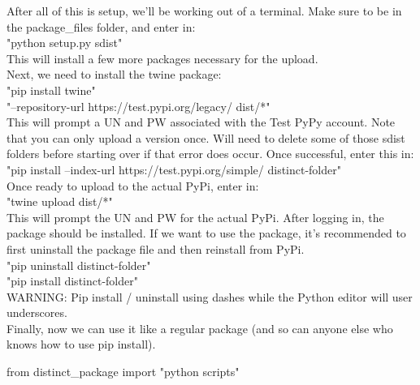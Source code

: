After all of this is setup, we'll be working out of a terminal. Make sure to be in the package\_files folder, and enter in:
\\

"python setup.py sdist"
\\

This will install a few more packages necessary for the upload.
\\

Next, we need to install the twine package:
\\

"pip install twine"
\\

"--repository-url https://test.pypi.org/legacy/ dist/*"
\\

This will prompt a UN and PW associated with the Test PyPy account. Note that you can only upload a version once. Will need to delete some of those sdist folders before starting over if that error does occur. Once successful, enter this in:
\\

"pip install --index-url https://test.pypi.org/simple/ distinct-folder"
\\

Once ready to upload to the actual PyPi, enter in:
\\

"twine upload dist/*"
\\

This will prompt the UN and PW for the actual PyPi. After logging in, the package should be installed. If we want to use the package, it's recommended to first uninstall the package file and then reinstall from PyPi.
\\

"pip uninstall distinct-folder"
\\

"pip install distinct-folder"
\\

WARNING: Pip install / uninstall using dashes while the Python editor will user underscores.
\\

Finally, now we can use it like a regular package (and so can anyone else who knows how to use pip install).
\\

\begin{python}
	from distinct_package import "python scripts"
\end{python}


